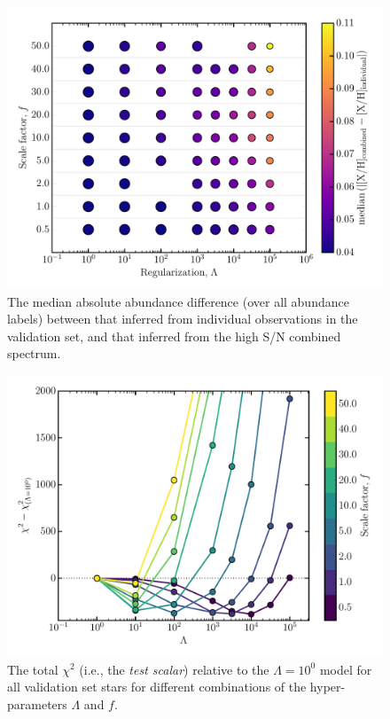 \documentclass[12pt,preprint]{aastex}
\begin{document}
\clearpage

\begin{figure}[p]
\centering
\includegraphics[width=\textwidth]{gs-mad-all-elements.pdf}
\caption{The median absolute abundance difference (over all abundance labels)
between that inferred from individual observations in the validation set, and
that inferred from the high S/N combined spectrum.
\label{fig:gridsearch-mad-all-elements}}
\end{figure}

\clearpage

\begin{figure}[p]
\centering
\includegraphics[width=\textwidth]{validation-scalar.pdf}
\caption{The total $\chi^2$ (i.e., the \emph{test scalar}) relative to the $\Lambda = 10^0$ model for all validation set stars for different combinations of the hyper-parameters $\Lambda$ and $f$.
 \label{fig:gridsearch-test-scalar}}
\end{figure}
\end{document}
